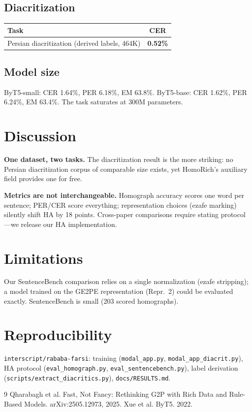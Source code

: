 \documentclass[11pt]{article}
\begin{document}
\subsection{Diacritization}
\begin{table}[h]
\centering
\begin{tabular}{lc}
\toprule
Task & CER \\
\midrule
Persian diacritization (derived labels, 464K) & \textbf{0.52\%} \\
\bottomrule
\end{tabular}
\end{table}

\subsection{Model size}
ByT5-small: CER 1.64\%, PER 6.18\%, EM 63.8\%. ByT5-base: CER 1.62\%,
PER 6.24\%, EM 63.4\%. The task saturates at 300M parameters.

\section{Discussion}
\textbf{One dataset, two tasks.} The diacritization result is the more
striking: no Persian diacritization corpus of comparable size exists, yet
HomoRich's auxiliary field provides one for free.

\textbf{Metrics are not interchangeable.} Homograph accuracy scores one
word per sentence; PER/CER score everything; representation choices
(ezafe marking) silently shift HA by 18 points. Cross-paper comparisons
require stating protocol---we release our HA implementation.

\section{Limitations}
Our SentenceBench comparison relies on a single normalization (ezafe
stripping); a model trained on the GE2PE representation (Repr.~2) could
be evaluated exactly. SentenceBench is small (203 scored homographs).

\section{Reproducibility}
\texttt{interscript/rababa-farsi}: training (\texttt{modal\_app.py},
\texttt{modal\_app\_diacrit.py}), HA protocol
(\texttt{eval\_homograph.py}, \texttt{eval\_sentencebench.py}), label
derivation (\texttt{scripts/extract\_diacritics.py}),
\texttt{docs/RESULTS.md}.

\begin{thebibliography}{9}
 Qharabagh et al. Fast, Not Fancy: Rethinking G2P with
Rich Data and Rule-Based Models. arXiv:2505.12973, 2025.
 Xue et al. ByT5. 2022.
\end{thebibliography}
\end{document}
